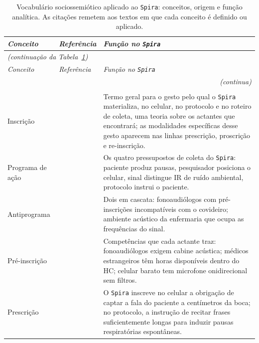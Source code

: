 \begin{longtable}{p{2.8cm}p{3.2cm}p{7.5cm}}
\caption[Vocabulário sociossemiótico aplicado ao \texttt{Spira}: conceitos, origem e função analítica.]{Vocabulário sociossemiótico aplicado ao \texttt{Spira}: conceitos, origem e função analítica. As citações remetem aos textos em que cada conceito é definido ou aplicado.} \label{tab:vocabulario_Spira} \\
\toprule
\textit{Conceito} & \textit{Referência} & \textit{Função no \texttt{Spira}} \\
\midrule
\endfirsthead
\multicolumn{3}{l}{\small\textit{(continuação da Tabela~\ref{tab:vocabulario_Spira})}} \\[2pt]
\toprule
\textit{Conceito} & \textit{Referência} & \textit{Função no \texttt{Spira}} \\
\midrule
\endhead
\midrule
\multicolumn{3}{r}{\small\textit{(continua)}} \\
\endfoot
\bottomrule
\endlastfoot
\multicolumn{3}{l}{\textit{Vocabulário analítico}} \\
\midrule
Inscrição & \parencite{Akrich1992Description} & Termo geral para o gesto pelo qual o \texttt{Spira} materializa, no celular, no protocolo e no roteiro de coleta, uma teoria sobre os actantes que encontrará; as modalidades específicas desse gesto aparecem nas linhas prescrição, proscrição e re-inscrição. \\
\addlinespace
Programa de ação & \parencite{AkrichLatour1992Convenient} & Os quatro pressupostos de coleta do \texttt{Spira}: paciente produz pausas, pesquisador posiciona o celular, sinal distingue IR de ruído ambiental, protocolo instrui o paciente. \\
\addlinespace
Antiprograma & \parencite{AkrichLatour1992Convenient} & Dois em cascata: fonoaudiólogos com pré-inscrições incompatíveis com o covideiro; ambiente acústico da enfermaria que ocupa as frequências do sinal. \\
\addlinespace
Pré-inscrição & \parencite{Akrich1992Description}& Competências que cada actante traz: fonoaudiólogos exigem cabine acústica; médicos estrangeiros têm horas disponíveis dentro do HC; celular barato tem microfone onidirecional sem filtros. \\
\addlinespace
Prescrição & \parencite{Akrich1992Description}& O \texttt{Spira} inscreve no celular a obrigação de captar a fala do paciente a centímetros da boca; no protocolo, a instrução de recitar frases suficientemente longas para induzir pausas respiratórias espontâneas. \\

\end{longtable}
